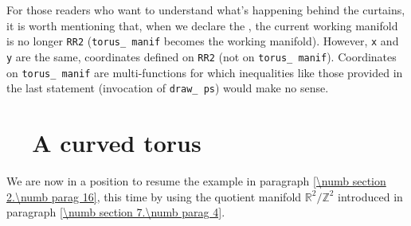 For those readers who want to understand what's happening behind the curtains,
it is worth mentioning that, when we declare the {\small\tt{}}
{\small\tt{}}, the current working manifold is no longer {\small\tt RR2}
({\small\tt torus\_\,manif} becomes the working manifold).
However, {\small\tt x} and {\small\tt y} are the same, coordinates defined on {\small\tt RR2}
(not on {\small\tt torus\_\,manif}).
Coordinates on {\small\tt torus\_\,manif} are multi-functions for which inequalities like
those provided in the last statement (invocation of {\small\tt draw\_\,ps}) would make no sense.


\section{~~A curved torus}\label{\numb section 7.\numb parag 5}

We are now in a position to resume the example in paragraph \ref{\numb section 2.\numb parag 16},
this time by using the quotient manifold $ \mathbb{R}^2/{\mathbb Z}^2 $ introduced in paragraph
\ref{\numb section 7.\numb parag 4}.

